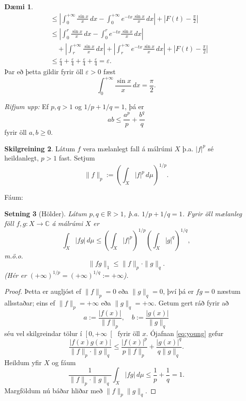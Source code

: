 \documentclass[a4paper,icelandic,11pt]{book}
\theoremstyle{plain}      \newtheorem{setn}{Setning}[chapter]
\theoremstyle{definition} \newtheorem{skilgr}[setn]{Skilgreining}
\newtheorem{daemi}[setn]{Dæmi}
\theoremstyle{remark}     \newtheorem*{ath}{Athugasemd}
\newcommand{\R}{\mathbb R}
\newcommand{\C}{\mathbb C}
\begin{document}
\begin{daemi}
\begin{align*}
    &\le \left|
      \int_{0}^{+\infty}\frac{\sin x}x\,dx
      - \int_{0}^{+\infty}e^{-tx}\frac{\sin x}x\,dx
    \right|
    + \left|F(t)-\frac\pi 2\right|
    \\
    &\le \left|
      \int_{0}^{r} \frac{\sin x}x\,dx 
      - \int_{0}^{r} e^{-tx}\frac{\sin x}x\,dx
    \right|
    \\
    &\quad
    + \left|
      \int_{r}^{+\infty}
      \frac{\sin x}x\,dx 
    \right|
     + \left|
       \int_{r}^{+\infty}
       e^{-tx}\frac{\sin x}x\,dx
    \right|
    + \left| F(t) - \frac\pi2 \right|
    \\
    &\le
    \frac\varepsilon 4
    + \frac\varepsilon 4
    + \frac\varepsilon 4
    + \frac\varepsilon 4
    = \varepsilon.
  \end{align*}
  Þar eð þetta gildir fyrir öll $\varepsilon > 0$ fæst
  \[
  \int_{0}^{+\infty}\frac{\sin x}x\,dx
  = \frac \pi 2.
  \]
\end{daemi}
\emph{Rifjum upp:} Ef $p,q>1$ og $1/p + 1/q = 1$, þá er
\begin{equation}
  \label{eq:young}
  ab \le \frac {a^{p}}p + \frac{b^{q}}q
\end{equation}
fyrir öll $a,b\ge 0$.
\begin{skilgr}
  Látum $f$ vera mælanlegt fall á málrúmi $X$ þ.a. $|f|^{p}$ sé
  heildanlegt, $p>1$ fast. Setjum
  \[
  \|f\|_{p} := \left(\int_{X}|f|^{p}\,d\mu\right)^{1/p}.
  \]
\end{skilgr}
Fáum:
\begin{setn}
  [Hölder]
  Látum $p,q\in\R>1$, þ.a. $1/p + 1/q = 1$. Fyrir öll mælanleg föll
  $f,g:X\to\C$ á málrúmi $X$ er
  \[
  \int_{X}|fg|\,d\mu
  \le \left(\int_{X}|f|^{p}\right)^{1/p}
  \left(\int_{X}|g|^{q}\right)^{1/q},
  \]
  m.ö.o.
  \[
  \| fg\|_{1 }
  \le \|f\|_{p}\cdot \|g\|_{q}.
  \]
  (Hér er $(+\infty)^{1/p}=(+\infty)^{1/q}:=+\infty$).
\end{setn}
\begin{proof}
  Þetta er augljóst ef $\|f\|_{p}=0$ eða $\|g\|_{q}=0$, því þá er
  $fg=0$ næstum allsstaðar; eins ef $\|f\|_{p}=+\infty$ eða
  $\|g\|_{q}=+\infty$. Getum gert ráð fyrir að
  \[
  a := \frac{|f(x)|}{\|f\|_{p}},
  \quad
  b := \frac{|g(x)|}{\|g\|_{q}}
  \]
  séu vel skilgreindar tölur í $\left[0,+\infty\right[$ fyrir öll
  $x$. Ójafnan \eqref{eq:young} gefur
  \[
  \frac{|f(x)g(x)|}{\|f\|_{p}\cdot\|g\|_{q}}
  \le \frac{|f(x)|^{p}}{p\|f\|_{p}}
  + \frac{|g(x)|^{q}}{q\|g\|_{q}}.
  \]
  Heildum yfir $X$ og fáum
  \[
  \frac{1}{\|f\|_{p}\cdot\|g\|_{q}}
  \int_{X}|fg|\,d\mu
  \le \frac 1p + \frac 1q = 1.
  \]
  Margföldum nú báðar hliðar með $\|f\|_{p}\|g\|_{q}$.
\end{proof}
\end{document}
